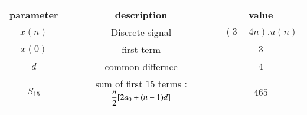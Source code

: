 \begin{tabular}{|c|c|c|}
\hline
     \textbf{parameter} & \textbf{description} & \textbf{value} \\
     \hline
     $x(n)$ & Discrete signal & $(3 +4n).u(n)$\\
     \hline
     $x(0)$ & first term & $3$\\
     \hline
     $d$ & common differnce & $4$ \\
     \hline
     $S_{15}$ &  sum of first $15$ terms :$\dfrac{n}{2\vphantom{\brak{0.1}}} [2a_0 + (n-1)d]$ & $465$ \\
     \hline
\end{tabular}
